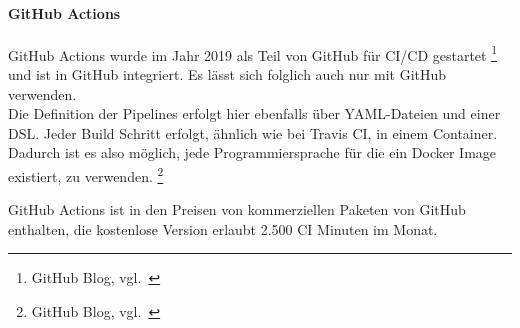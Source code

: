 \paragraph{GitHub Actions}\label{ci_services_tools_github_actions}

GitHub Actions wurde im Jahr 2019 als Teil von GitHub für CI/CD gestartet \footnote{GitHub Blog, vgl.~\cite{GITHUB_ACTIONS}}
und ist in GitHub integriert.
Es lässt sich folglich auch nur mit GitHub verwenden. \\

Die Definition der Pipelines erfolgt hier ebenfalls über YAML-Dateien und einer DSL.
Jeder Build Schritt erfolgt, ähnlich wie bei Travis CI, in einem Container.
Dadurch ist es also möglich, jede Programmiersprache für die ein Docker Image existiert, zu verwenden. \footnote{GitHub Blog, vgl.~\cite{GITHUB_ACTIONS_DOCS}}

GitHub Actions ist in den Preisen von kommerziellen Paketen von GitHub enthalten, die kostenlose Version
erlaubt 2.500 CI Minuten im Monat. \\






